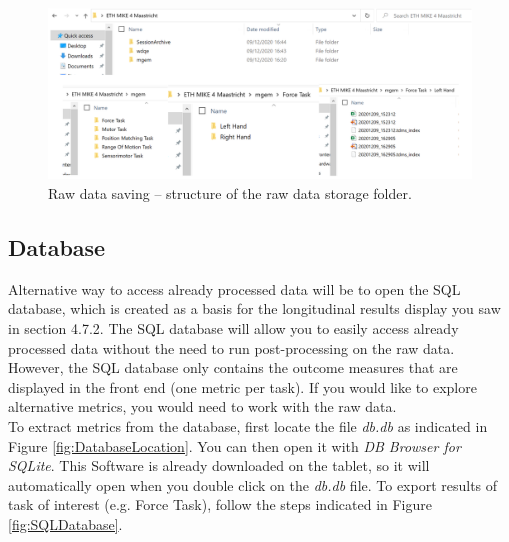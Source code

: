 \documentclass[10pt,oneside,a4paper]{article}
\begin{document}
\begin{figure}[h!]
\begin{center}
\includegraphics[width=\columnwidth]{images/TabletScreenshots/DataSaving.png}
\caption{Raw data saving – structure of the raw data storage folder.}
\label{fig:RawData}
\end{center}
\end{figure}

\subsection{Database}
Alternative way to access already processed data will be to open the SQL database, which is created as a basis for the longitudinal results display you saw in section 4.7.2. The SQL database will allow you to easily access already processed data without the need to run post-processing on the raw data. However, the SQL database only contains the outcome measures that are displayed in the front end (one metric per task). If you would like to explore alternative metrics, you would need to work with the raw data. \\

To extract metrics from the database, first locate the file \emph{db.db} as indicated in Figure \ref{fig:DatabaseLocation}. You can then open it with \emph{DB Browser for SQLite}. This Software is already downloaded on the tablet, so it will automatically open when you double click on the \emph{db.db} file. To export results of task of interest (e.g. Force Task), follow the steps indicated in Figure \ref{fig:SQLDatabase}. 
\end{document}
